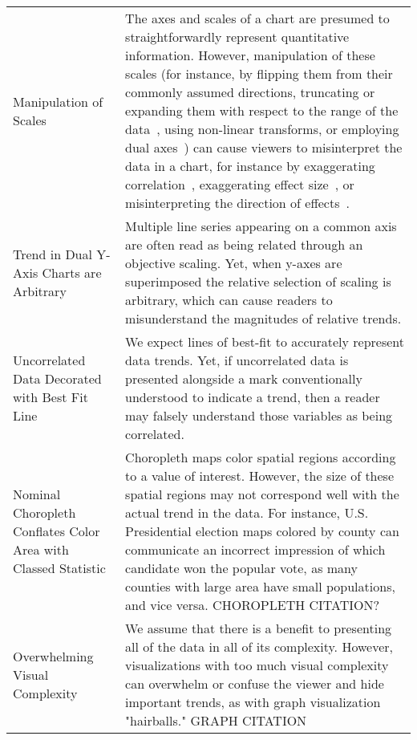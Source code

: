 \begin{longtable}{p{3cm}p{14cm}}
 \rowcolor{colorc}Manipulation of Scales & The axes and scales of a chart are presumed to straightforwardly represent quantitative information. However, manipulation of these scales (for instance, by flipping them from their commonly assumed directions, truncating or expanding them with respect to the range of the data~\cite{pandey2015deceptive, correll2017black, cleveland1982variables, ritchie2019lie, correll2019truncating}, using non-linear transforms, or employing dual axes~\cite{KindlmannAlgebraicVisPedagogyPDV2016, cairo2015graphics}) can cause viewers to misinterpret the data in a chart, for instance by exaggerating correlation~\cite{cleveland1982variables}, exaggerating effect size~\cite{correll2019truncating,pandey2015deceptive}, or misinterpreting the direction of effects~\cite{pandey2015deceptive}. \cite{cairo2015graphics,correll2017black,correll2019truncating,cleveland1982variables,KindlmannAlgebraicVisPedagogyPDV2016,pandey2015deceptive,ritchie2019lie}\\
 \rowcolor{colorc-opaque}Trend in Dual Y-Axis Charts are Arbitrary  & Multiple line series appearing on a common axis are often read as being related through an objective scaling. Yet, when y-axes are superimposed the relative selection of scaling is arbitrary, which can cause readers to misunderstand the magnitudes of relative trends. \cite{KindlmannAlgebraicVisPedagogyPDV2016, cairo2015graphics}\\
 \rowcolor{colorc}Uncorrelated Data Decorated with Best Fit Line  & We expect lines of best-fit to accurately represent data trends. Yet, if uncorrelated data is presented alongside a mark conventionally understood to indicate a trend, then a reader may falsely understand those variables as being correlated.   \\
 \rowcolor{colorc-opaque}Nominal Choropleth Conflates Color Area with Classed Statistic & Choropleth maps color spatial regions according to a value of interest. However, the size of these spatial regions may not correspond well with the actual trend in the data. For instance, U.S. Presidential election maps colored by county can communicate an incorrect impression of which candidate won the popular vote, as many counties with large area have small populations, and vice versa. \cite{gastner2005maps} CHOROPLETH CITATION?\\
 \rowcolor{colorc}Overwhelming Visual Complexity & We assume that there is a benefit to presenting all of the data in all of its complexity. However, visualizations with too much visual complexity can overwhelm or confuse the viewer and hide important trends, as with graph visualization "hairballs." \cite{hofmann2012graphical} GRAPH CITATION\\


\end{longtable}
